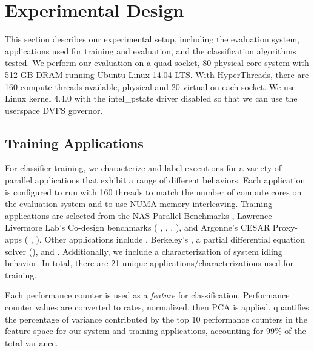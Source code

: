 \section{Experimental Design}
\label{sec:classifiers-usage}

This section describes our experimental setup, including the evaluation system, applications used for training and evaluation, and the classification algorithms tested.
We perform our evaluation on a quad-socket, 80-physical core system with 512 GB DRAM running Ubuntu Linux 14.04 LTS.
With HyperThreads, there are 160 compute threads available,  physical and 20 virtual on each socket.
We use Linux kernel 4.4.0 with the intel\_pstate driver disabled so that we can use the userspace DVFS governor.


\subsection{Training Applications}
\label{sec:setup-training}


For classifier training, we characterize and label executions for a variety of parallel applications that exhibit a range of different behaviors.
Each application is configured to run with 160 threads to match the number of compute cores on the
evaluation system and to use NUMA memory interleaving.
Training applications are selected from the NAS Parallel Benchmarks \cite{NPB}, Lawrence Livermore Lab's Co-design benchmarks ( \cite{BoomerAMG},  \cite{Kripke},  \cite{LULESH2},  \cite{Quicksilver}), and Argonne's CESAR Proxy-apps ( \cite{XSBench},  \cite{RSBench}).
Other applications include  \cite{CoMDGit}, Berkeley's  \cite{hpgmg}, a partial differential equation solver (), and  \cite{stream}.
Additionally, we include a characterization of system idling behavior.
In total, there are 21 unique applications/characterizations used for training.

Each performance counter is used as a \emph{feature} for classification.
Performance counter values are converted to rates, normalized, then PCA is applied.
 quantifies the percentage of variance contributed by the top 10 performance counters in the feature space for our system and training applications, accounting for 99\% of the total variance.


